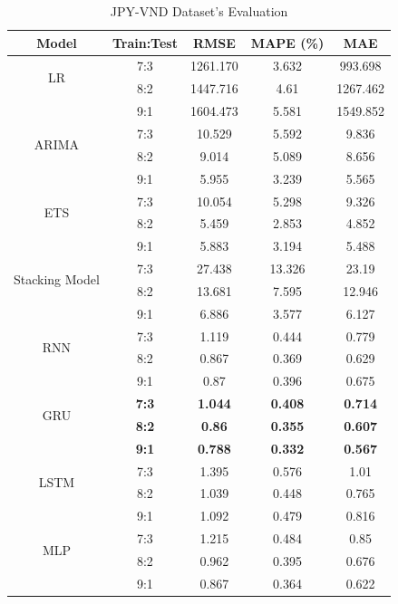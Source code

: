 \documentclass{ieeeojies}
\begin{document}
\begin{table}[H]
    \centering
    \begin{tabular}{|c|c|c|c|c|}
         \hline
         \centering Model & Train:Test & RMSE & MAPE (\%) & MAE\\
         \hline
         \multirow{2}{*}{LR} &7:3&1261.170 &3.632&993.698 \\ &8:2 & 1447.716&4.61&1267.462 \\&9:1 & 1604.473	&5.581	&1549.852 \\
         \hline
         \multirow{2}{*}{ARIMA} & 7:3 & 10.529 & 5.592 & 9.836 \\ & 8:2 & 9.014 & 5.089 & 8.656 \\& 9:1& 5.955 &3.239&5.565 \\
         \hline
         \multirow{2}{*}{ETS} & 7:3 & 10.054&5.298&9.326 \\ & 8:2 &5.459&2.853 &4.852\\& 9:1 &5.883&3.194&5.488 \\
         \hline
         \multirow{2}{*}{Stacking Model} & 7:3 & 27.438	&13.326	&23.19 \\& 8:2 &13.681	&7.595&	12.946\\ & 9:1&6.886 &3.577 &6.127\\
         \hline
         \multirow{2}{*}{RNN} & 7:3 & 1.119 & 0.444 &0.779 \\ &8:2 & 0.867 &0.369 & 0.629 \\ & 9:1 & 0.87 & 0.396 & 0.675 \\
         \hline
         \multirow{2}{*}{GRU} & \textbf{7:3} & \textbf{1.044} & \textbf{0.408} & \textbf{0.714} \\ & \textbf{8:2} & \textbf{0.86} & \textbf{0.355} & \textbf{0.607} \\ &\textbf{9:1} &\textbf{0.788}& \textbf{0.332} & \textbf{0.567} \\
         \hline
         \multirow{2}{*}{LSTM} & 7:3 & 1.395 &0.576& 1.01 \\& 8:2 &1.039 &0.448 &0.765 \\ &9:1 &1.092& 0.479& 0.816\\
         \hline
         \multirow{2}{*}{MLP} & 7:3 &1.215 &0.484 &0.85 \\ &8:2 &0.962& 0.395 &0.676\\ & 9:1 &0.867 &0.364 &0.622 \\
         \hline
    \end{tabular}
    \caption{JPY-VND Dataset's Evaluation}
    \label{mbbresult}
\end{table}
\end{document}
